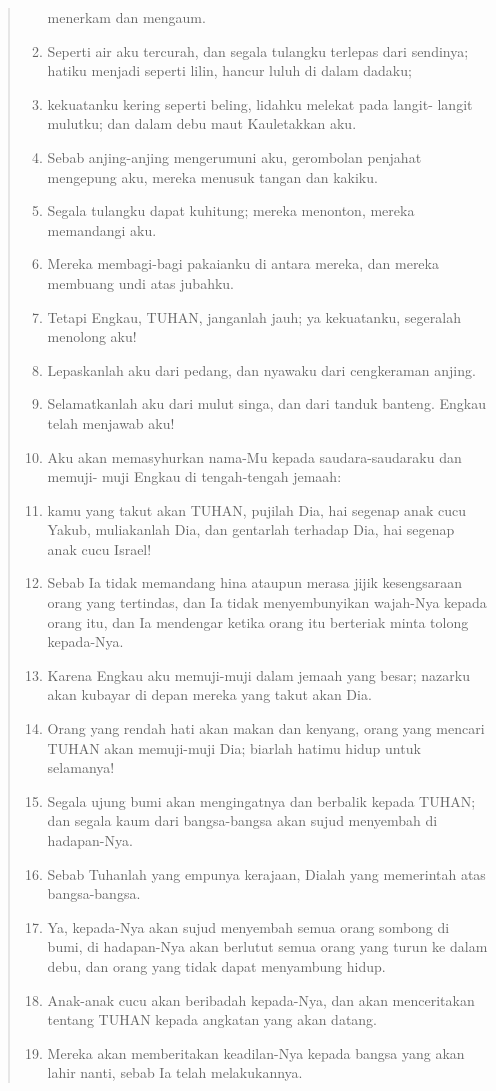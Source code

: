 \begin{quote}
\begin{enumerate}
     menerkam dan mengaum.
     \item Seperti air aku tercurah, dan segala tulangku terlepas dari
     sendinya; hatiku menjadi seperti lilin, hancur luluh di dalam dadaku;
     \item kekuatanku kering seperti beling, lidahku melekat pada langit-
     langit mulutku; dan dalam debu maut Kauletakkan aku.
     \item Sebab anjing-anjing mengerumuni aku, gerombolan penjahat mengepung
     aku, mereka menusuk tangan dan kakiku.
     \item Segala tulangku dapat kuhitung; mereka menonton, mereka memandangi
     aku.
     \item Mereka membagi-bagi pakaianku di antara mereka, dan mereka
     membuang undi atas jubahku.
     \item Tetapi Engkau, TUHAN, janganlah jauh; ya kekuatanku, segeralah
     menolong aku!
     \item Lepaskanlah aku dari pedang, dan nyawaku dari cengkeraman anjing.
     \item Selamatkanlah aku dari mulut singa, dan dari tanduk banteng.
     Engkau telah menjawab aku!
     \item Aku akan memasyhurkan nama-Mu kepada saudara-saudaraku dan memuji-
     muji Engkau di tengah-tengah jemaah:
     \item kamu yang takut akan TUHAN, pujilah Dia, hai segenap anak cucu
     Yakub, muliakanlah Dia, dan gentarlah terhadap Dia, hai segenap anak
     cucu Israel!
     \item Sebab Ia tidak memandang hina ataupun merasa jijik kesengsaraan
     orang yang tertindas, dan Ia tidak menyembunyikan wajah-Nya kepada
     orang itu, dan Ia mendengar ketika orang itu berteriak minta tolong
     kepada-Nya.
     \item Karena Engkau aku memuji-muji dalam jemaah yang besar; nazarku
     akan kubayar di depan mereka yang takut akan Dia.
     \item Orang yang rendah hati akan makan dan kenyang, orang yang mencari
     TUHAN akan memuji-muji Dia; biarlah hatimu hidup untuk selamanya!
     \item Segala ujung bumi akan mengingatnya dan berbalik kepada TUHAN; dan
     segala kaum dari bangsa-bangsa akan sujud menyembah di hadapan-Nya.
     \item Sebab Tuhanlah yang empunya kerajaan, Dialah yang memerintah atas
     bangsa-bangsa.
     \item Ya, kepada-Nya akan sujud menyembah semua orang sombong di bumi,
     di hadapan-Nya akan berlutut semua orang yang turun ke dalam debu,
     dan orang yang tidak dapat menyambung hidup.
     \item Anak-anak cucu akan beribadah kepada-Nya, dan akan menceritakan
     tentang TUHAN kepada angkatan yang akan datang.
     \item Mereka akan memberitakan keadilan-Nya kepada bangsa yang akan
     lahir nanti, sebab Ia telah melakukannya.
\end{enumerate}
\end{quote}

